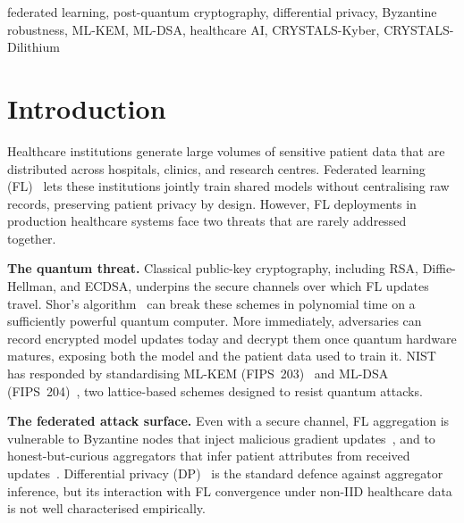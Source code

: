 \documentclass[conference]{IEEEtran}
\begin{document}
\begin{IEEEkeywords}
federated learning, post-quantum cryptography, differential privacy,
Byzantine robustness, ML-KEM, ML-DSA, healthcare AI, CRYSTALS-Kyber,
CRYSTALS-Dilithium
\end{IEEEkeywords}

\section{Introduction}
\label{sec:intro}

Healthcare institutions generate large volumes of sensitive patient
data that are distributed across hospitals, clinics, and research
centres.
Federated learning (FL)~\cite{mcmahan2017} lets these institutions
jointly train shared models without centralising raw records,
preserving patient privacy by design.
However, FL deployments in production healthcare systems face two
threats that are rarely addressed together.

\textbf{The quantum threat.}
Classical public-key cryptography, including RSA, Diffie-Hellman, and
ECDSA, underpins the secure channels over which FL updates travel.
Shor's algorithm~\cite{shor1994} can break these schemes in polynomial
time on a sufficiently powerful quantum computer.
More immediately, adversaries can record encrypted model updates today
and decrypt them once quantum hardware matures, exposing both the
model and the patient data used to train it.
NIST has responded by standardising ML-KEM (FIPS~203)~\cite{nistfips203}
and ML-DSA (FIPS~204)~\cite{nistfips204}, two lattice-based schemes
designed to resist quantum attacks.

\textbf{The federated attack surface.}
Even with a secure channel, FL aggregation is vulnerable to Byzantine
nodes that inject malicious gradient updates~\cite{blanchard2017}, and
to honest-but-curious aggregators that infer patient attributes from
received updates~\cite{geiping2020}.
Differential privacy (DP)~\cite{dwork2006} is the standard defence
against aggregator inference, but its interaction with FL convergence
under non-IID healthcare data is not well characterised empirically.
\end{document}
